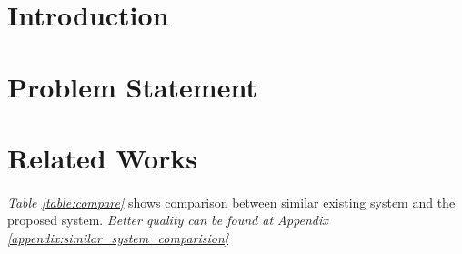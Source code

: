 \documentclass[12pt]{paper}
\begin{document}
		\section{Introduction}
		\section{Problem Statement}
		\section{Related Works}
		\paragraph{} \textit{Table \ref{table:compare}} shows comparison between similar existing system and the proposed system.  
		\textit{Better quality can be found at Appendix \ref{appendix:similar_system_comparision}}
		\def\arraystretch{1.5}
		\renewcommand\tabularxcolumn[1]{>{\Centering}m{#1}}
\end{document}
